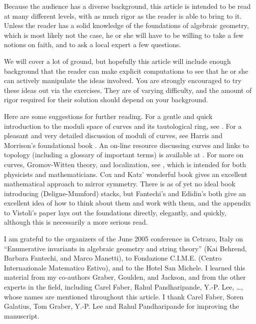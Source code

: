 \documentclass[12pt,letterpaper]{amsart}
\begin{document}
{Because the audience has a diverse background, this article is 
intended to be read at many different levels, with as much rigor as
the reader is able to bring to it. Unless the reader has a solid knowledge of
the foundations of algebraic geometry, which is most likely not the
case, he or she will have to be willing to take a few notions on
faith, and to ask a local expert a few questions.

We will cover a lot of ground, but hopefully this article will include
enough background that the reader can make explicit computations to
see that he or she can actively manipulate the ideas involved.  You
are strongly encouraged to try these ideas out via the exercises.
They are of varying difficulty, and the amount of rigor required for
their solution should depend on your
background.

Here are some suggestions for further reading.  For a gentle and quick
introduction to the moduli space of curves and its tautological ring,
see \cite{notices}.  For a pleasant and very detailed discussion of
moduli of curves, see Harris and Morrison's foundational book
\cite{hm}.  An on-line resource discussing curves and links to topology
(including a glossary of important terms) is available at \cite{aim}.
For more on curves, Gromov-Witten theory, and localization, see
\cite[Chapter 22--27]{mirsym}, which is intended for both physicists
and mathematicians.  Cox and Katz' wonderful book \cite{coxkatz} gives
an excellent mathematical approach to mirror symmetry.  There is as of
yet no ideal book introducing (Deligne-Mumford) stacks, but Fantechi's
\cite{fantechi} and Edidin's \cite{edidin} both give an excellent idea
of how to think about them and work with them, and the appendix to
Vistoli's paper \cite{vistoli} lays out the foundations directly,
elegantly, and quickly, although this is necessarily a more serious
read.

 I am grateful to the organizers of
the June 2005 conference in Cetraro, Italy on ``Enumerative invariants
in algebraic geometry and string theory'' (Kai Behrend, Barbara
Fantechi, and Marco Manetti), to Fondazione C.I.M.E. (Centro
Internazionale Matematico Estivo), and to the Hotel San Michele. I
learned this material from my co-authors Graber, Goulden, and Jackson,
and from the other experts in the field, including Carel Faber, Rahul
Pandharipande, Y.-P. Lee, \dots, whose names are mentioned throughout
this article.  I thank Carel Faber, Soren Galatius, Tom Graber,
Y.-P. Lee and Rahul Pandharipande for improving the manuscript.

}
\end{document}
